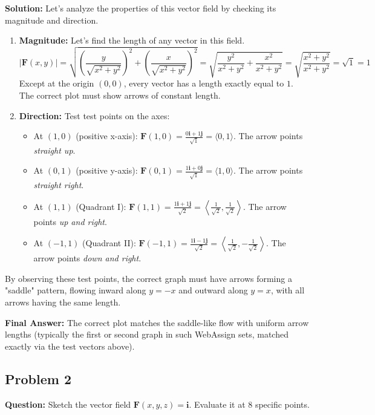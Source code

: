 \documentclass[11pt]{article}
\begin{document}
\textbf{Solution:}
Let's analyze the properties of this vector field by checking its magnitude and direction.
\begin{enumerate}
    \item \textbf{Magnitude:} Let's find the length of any vector in this field.
    \[ |\mathbf{F}(x,y)| = \sqrt{ \left(\frac{y}{\sqrt{x^2+y^2}}\right)^2 + \left(\frac{x}{\sqrt{x^2+y^2}}\right)^2 } = \sqrt{\frac{y^2}{x^2+y^2} + \frac{x^2}{x^2+y^2}} = \sqrt{\frac{x^2+y^2}{x^2+y^2}} = \sqrt{1} = 1 \]
    Except at the origin $(0,0)$, every vector has a length exactly equal to $1$. The correct plot must show arrows of constant length.
    \item \textbf{Direction:} Test test points on the axes:
    \begin{itemize}
        \item At $(1, 0)$ (positive x-axis): $\mathbf{F}(1, 0) = \frac{0\mathbf{i} + 1\mathbf{j}}{\sqrt{1}} = \langle 0, 1 \rangle$. The arrow points \textit{straight up}.
        \item At $(0, 1)$ (positive y-axis): $\mathbf{F}(0, 1) = \frac{1\mathbf{i} + 0\mathbf{j}}{\sqrt{1}} = \langle 1, 0 \rangle$. The arrow points \textit{straight right}.
        \item At $(1, 1)$ (Quadrant I): $\mathbf{F}(1, 1) = \frac{1\mathbf{i} + 1\mathbf{j}}{\sqrt{2}} = \left\langle \frac{1}{\sqrt{2}}, \frac{1}{\sqrt{2}} \right\rangle$. The arrow points \textit{up and right}.
        \item At $(-1, 1)$ (Quadrant II): $\mathbf{F}(-1, 1) = \frac{1\mathbf{i} - 1\mathbf{j}}{\sqrt{2}} = \left\langle \frac{1}{\sqrt{2}}, -\frac{1}{\sqrt{2}} \right\rangle$. The arrow points \textit{down and right}.
    \end{itemize}
\end{enumerate}
By observing these test points, the correct graph must have arrows forming a "saddle" pattern, flowing inward along $y=-x$ and outward along $y=x$, with all arrows having the same length.

\textbf{Final Answer:} The correct plot matches the saddle-like flow with uniform arrow lengths (typically the first or second graph in such WebAssign sets, matched exactly via the test vectors above).

\subsection*{Problem 2}
\textbf{Question:} Sketch the vector field $\mathbf{F}(x, y, z) = \mathbf{i}$. Evaluate it at 8 specific points.
\end{document}
